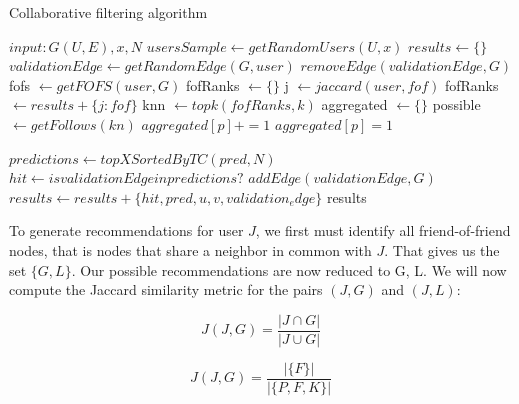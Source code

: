 %
%   
%  

\begin{algorithm}
\caption{Collaborative filtering algorithm}\label{algo1}
\begin{algorithmic}[1]
\State $input: G(U, E), x, N$ 
\State $usersSample \gets getRandomUsers(U,x)$
\State $results \gets \{\}$
	\State $validationEdge \gets getRandomEdge(G, user)$
	\State $removeEdge(validationEdge,G)$
	\State fofs $\gets getFOFS(user, G)$
	\State fofRanks $ \gets \{\}$
		\State j $\gets jaccard(user, fof)$
		fofRanks $\gets results + \{j : fof\}$
	\EndFor
	\State knn $\gets topk(fofRanks, k)$
	\State aggregated $\gets \{\}$
		\State possible $\gets getFollows(kn)$
			 $aggregated[p] += 1$ 
			\Else 
				\State $aggregated[p] = 1$
			\EndIf
		\EndFor
	\EndFor
	
	\State $predictions \gets topXSortedByTC(pred, N)$
	\State $hit \gets is validationEdge in predictions?$
	\State $addEdge(validationEdge, G)$
	\State $results \gets results + \{hit, pred, u, v, validation_edge\}$
\EndFor
\State \Return results
\end{algorithmic}
\end{algorithm}

To generate recommendations for user $J$, we first must identify all friend-of-friend nodes, that is nodes that share a neighbor in common with $J$. That gives us the set $\{G, L\}$. Our possible recommendations are now reduced to G, L. We will now compute the Jaccard similarity metric for the pairs $(J, G)$ and $(J, L)$:

\begin{equation}
\label{jaccard}
J(J,G) = \frac{|J \cap G|}{|J \cup G|}
\end{equation}

\begin{equation}
\label{jaccard}
J(J,G) = \frac{|\{F\}|}{|\{P, F, K\}|}
\end{equation}

